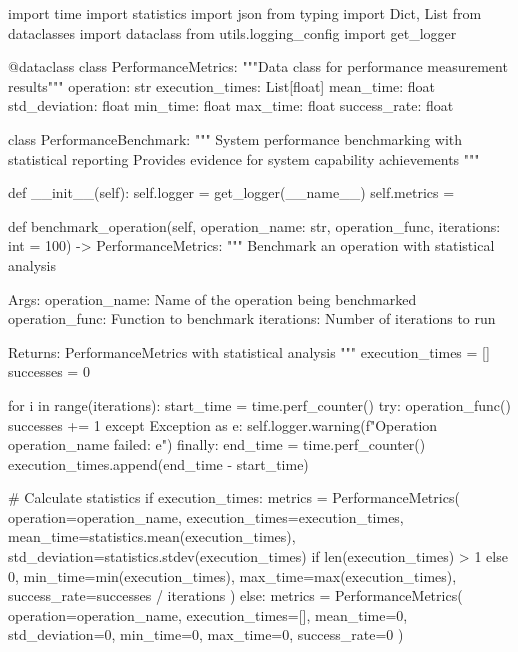 \documentclass[11pt,a4paper]{report}
\begin{document}
import time
import statistics
import json
from typing import Dict, List
from dataclasses import dataclass
from utils.logging\_config import get\_logger


@dataclass
class PerformanceMetrics:
    """Data class for performance measurement results"""
    operation: str
    execution\_times: List[float]
    mean\_time: float
    std\_deviation: float
    min\_time: float
    max\_time: float
    success\_rate: float


class PerformanceBenchmark:
    """
    System performance benchmarking with statistical reporting
    Provides evidence for system capability achievements
    """

    def \_\_init\_\_(self):
        self.logger = get\_logger(\_\_name\_\_)
        self.metrics = {}

    def benchmark\_operation(self, operation\_name: str, operation\_func,
                            iterations: int = 100) -> PerformanceMetrics:
        """
        Benchmark an operation with statistical analysis

        Args:
            operation\_name: Name of the operation being benchmarked
            operation\_func: Function to benchmark
            iterations: Number of iterations to run

        Returns:
            PerformanceMetrics with statistical analysis
        """
        execution\_times = []
        successes = 0

        for i in range(iterations):
            start\_time = time.perf\_counter()
            try:
                operation\_func()
                successes += 1
            except Exception as e:
                self.logger.warning(f"Operation {operation\_name} failed: {e}")
            finally:
                end\_time = time.perf\_counter()
                execution\_times.append(end\_time - start\_time)

        \# Calculate statistics
        if execution\_times:
            metrics = PerformanceMetrics(
                operation=operation\_name,
                execution\_times=execution\_times,
                mean\_time=statistics.mean(execution\_times),
                std\_deviation=statistics.stdev(execution\_times) if len(execution\_times) > 1 else 0,
                min\_time=min(execution\_times),
                max\_time=max(execution\_times),
                success\_rate=successes / iterations
            )
        else:
            metrics = PerformanceMetrics(
                operation=operation\_name,
                execution\_times=[],
                mean\_time=0,
                std\_deviation=0,
                min\_time=0,
                max\_time=0,
                success\_rate=0
            )
\end{document}

